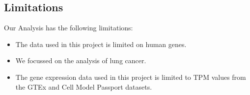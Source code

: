 \subsection{Limitations} \label{subsec:limitations}

{\color{lightgray}
Our Analysis has the following limitations:
\begin{itemize}
    \item The data used in this project is limited on human genes.
    \item We focussed on the analysis of lung cancer.
    \item The gene expression data used in this project is limited to TPM values from the GTEx and Cell Model Passport datasets.
\end{itemize}

}